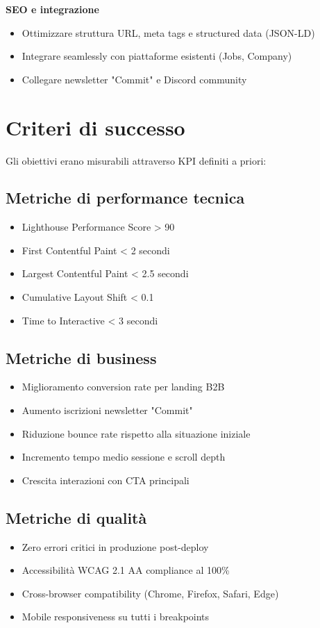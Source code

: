 \textbf{SEO e integrazione}
\begin{itemize}
  \item Ottimizzare struttura URL, meta tags e structured data (JSON-LD)
  \item Integrare seamlessly con piattaforme esistenti (Jobs, Company)
  \item Collegare newsletter "Commit" e Discord community
\end{itemize}

\section{Criteri di successo}
Gli obiettivi erano misurabili attraverso KPI definiti a priori:

\subsection{Metriche di performance tecnica}
\begin{itemize}
  \item Lighthouse Performance Score > 90
  \item First Contentful Paint < 2 secondi
  \item Largest Contentful Paint < 2.5 secondi
  \item Cumulative Layout Shift < 0.1
  \item Time to Interactive < 3 secondi
\end{itemize}

\subsection{Metriche di business}
\begin{itemize}
  \item Miglioramento conversion rate per landing B2B
  \item Aumento iscrizioni newsletter "Commit"
  \item Riduzione bounce rate rispetto alla situazione iniziale
  \item Incremento tempo medio sessione e scroll depth
  \item Crescita interazioni con CTA principali
\end{itemize}

\subsection{Metriche di qualità}
\begin{itemize}
  \item Zero errori critici in produzione post-deploy
  \item Accessibilità WCAG 2.1 AA compliance al 100\%
  \item Cross-browser compatibility (Chrome, Firefox, Safari, Edge)
  \item Mobile responsiveness su tutti i breakpoints
\end{itemize}


